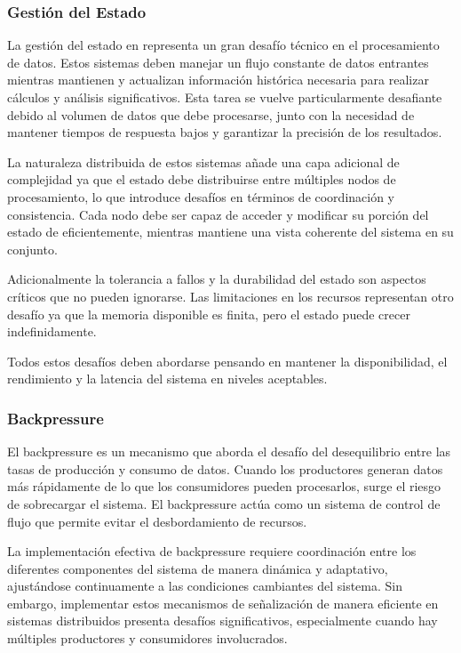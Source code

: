 \subsubsection{Gestión del Estado}

La gestión del estado en representa un gran desafío técnico en el procesamiento de datos.
Estos sistemas deben manejar un flujo constante de datos entrantes mientras mantienen y actualizan información histórica necesaria para realizar cálculos y análisis significativos. 
Esta tarea se vuelve particularmente desafiante debido al volumen de datos que debe procesarse, junto con la necesidad de mantener tiempos de respuesta bajos y garantizar la precisión de los resultados.

La naturaleza distribuida de estos sistemas añade una capa adicional de complejidad ya que el estado debe distribuirse entre múltiples nodos de procesamiento, 
lo que introduce desafíos en términos de coordinación y consistencia. Cada nodo debe ser capaz de acceder y modificar su porción del estado de eficientemente, 
mientras mantiene una vista coherente del sistema en su conjunto. 

Adicionalmente la tolerancia a fallos y la durabilidad del estado son aspectos críticos que no pueden ignorarse.
Las limitaciones en los recursos representan otro desafío ya que la memoria disponible es finita, pero el estado puede crecer indefinidamente. 

Todos estos desafíos deben abordarse pensando en mantener la disponibilidad, el rendimiento y la latencia del sistema en niveles aceptables.

\subsubsection{Backpressure}

El backpressure es un mecanismo que aborda el desafío del desequilibrio entre las tasas de producción y consumo de datos. 
Cuando los productores generan datos más rápidamente de lo que los consumidores pueden procesarlos, surge el riesgo de sobrecargar el sistema. 
El backpressure actúa como un sistema de control de flujo que permite evitar el desbordamiento de recursos.

La implementación efectiva de backpressure requiere coordinación entre los diferentes componentes del sistema de manera dinámica y adaptativo, ajustándose continuamente a las condiciones cambiantes del sistema. 
Sin embargo, implementar estos mecanismos de señalización de manera eficiente en sistemas distribuidos presenta desafíos significativos, especialmente cuando hay múltiples productores y consumidores involucrados.

